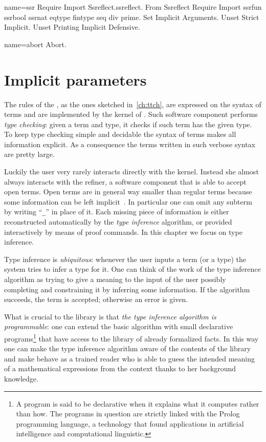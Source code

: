 \begin{coqdef}{name=ssr}
Require Import Ssreflect.ssreflect.
From Ssreflect Require Import ssrfun ssrbool ssrnat eqtype fintype seq div prime.
Set Implicit Arguments.
Unset Strict Implicit.
Unset Printing Implicit Defensive.
\end{coqdef}
\begin{coqdef}{name=abort}
Abort.
\end{coqdef}

\chapter{Implicit parameters}{}

The rules of the \mcbCIC{}, as the ones sketched in~\ref{ch:ttch},
are expressed on the syntax of terms and
are implemented by the kernel of \Coq{}.  Such software component
performs \emph{type checking}: given a term and type, it checks if such
term has the given type.  To keep type checking simple and decidable
the syntax of terms makes all information explicit. As a consequence
the terms written in such verbose syntax are pretty large.

Luckily the user very rarely interacts directly with the kernel.
Instead she almost always interacts with the refiner, a software
component that is able to accept open terms.  Open terms are in
general way smaller than regular terms because some information can be
left implicit~\cite{Pollack92implicitsyntax}.
In particular one can omit any subterm by writing
``\lstinline/_/'' in place of it.
Each missing piece of information is either reconstructed
automatically by the \emph{type inference} algorithm, or provided
interactively by means of proof commands.  In this chapter we
focus on type inference.

Type inference is \emph{ubiquitous}: whenever the user inputs a term
(or a type) the system tries to infer a type for it.
One can think of the work of the type inference
algorithm as trying to give a meaning to the input of the
user possibly completing and constraining it by inferring some
information.  If the algorithm succeeds, the term is accepted;
otherwise an error is given.

What is crucial to the \mcbMC{} library is that
\emph{the type inference algorithm is programmable}:
one can extend the
basic algorithm with small declarative programs\footnote{A program is
said to be declarative when it explains what it computes rather than
how. The programs in question are strictly linked with the Prolog
programming language, a technology that found applications in artificial
intelligence and computational linguistic.}
that have access to
the library of already formalized facts.  In this way one can make the
type inference algorithm aware of the contents of the library and
make \Coq{} behave as a trained reader who is able to guess the
intended meaning of a mathematical expressions from the context
thanks to her background knowledge.

